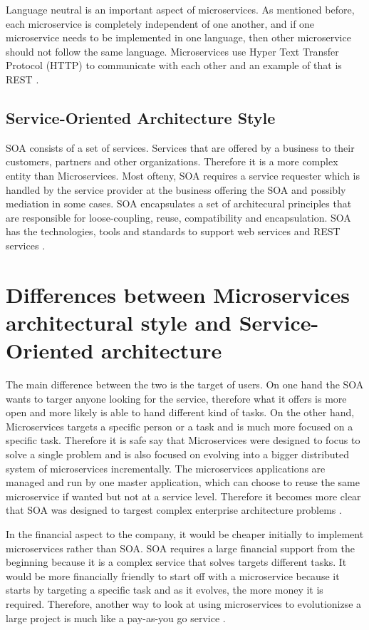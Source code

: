 \documentclass{IEEEtran}
\begin{document}
			Language neutral is an important aspect of microservices. As mentioned before, each microservice is completely independent of one another, and if one microservice needs to be implemented in one language, then other microservice should not follow the same language. Microservices use Hyper Text Transfer Protocol (HTTP) to communicate with each other and an example of that is REST \cite{ibmred}.

		\subsection{Service-Oriented Architecture Style}
			SOA consists of a set of services. Services that are offered by a business to their customers, partners and other organizations. Therefore it is a more complex entity than Microservices. Most ofteny, SOA requires a service requester which is handled by the service provider at the business offering the SOA and possibly mediation in some cases. SOA encapsulates a set of architecural principles that are responsible for loose-coupling, reuse, compatibility and encapsulation. SOA has the technologies, tools and standards to support web services and REST services \cite{ibmred}.


	\section{Differences between Microservices architectural style and Service-Oriented architecture}
		The main difference between the two is the target of users. On one hand the SOA wants to targer anyone looking for the service, therefore what it offers is more open and more likely is able to hand different kind of tasks. On the other hand, Microservices targets a specific person or a task and is much more focused on a specific task. Therefore it is safe say that Microservices were designed to focus to solve a single problem and is also focused on evolving into a bigger distributed system of microservices incrementally. The microservices applications are managed and run by one master application, which can choose to reuse the same microservice if wanted but not at a service level. Therefore it becomes more clear that SOA was designed to targest complex enterprise architecture problems \cite{ibmred}. 
		\newline
		
		In the financial aspect to the company, it would be cheaper initially to implement microservices rather than SOA. SOA requires a large financial support from the beginning because it is a complex service that solves targets different tasks. It would be more financially friendly to start off with a microservice because it starts by targeting a specific task and as it evolves, the more money it is required. Therefore, another way to look at using microservices to evolutionizse a large project is much like a pay-as-you go service \cite{ibmred}. 
\end{document}
